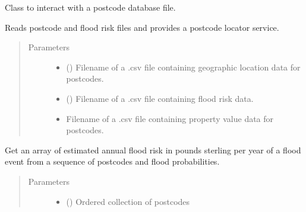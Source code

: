 \documentclass[letterpaper,10pt,english]{sphinxmanual}
\begin{document}
\begin{fulllineitems}
\label{\detokenize{index:flood_tool.Tool}}
Class to interact with a postcode database file.

Reads postcode and flood risk files and provides a postcode locator service.
\begin{quote}\begin{description}
\item[{Parameters}] \leavevmode\begin{itemize}
\item {} 
 (\sphinxstyleliteralemphasis{\sphinxupquote{, }}) \textendash{} Filename of a .csv file containing geographic location data for postcodes.

\item {} 
 (\sphinxstyleliteralemphasis{\sphinxupquote{, }}) \textendash{} Filename of a .csv file containing flood risk data.

\item {} 
 \textendash{} Filename of a .csv file containing property value data for postcodes.

\end{itemize}

\end{description}\end{quote}

\begin{fulllineitems}
\label{\detokenize{index:flood_tool.Tool.get_annual_flood_risk}}
Get an array of estimated annual flood risk in pounds sterling per year of a flood
event from a sequence of postcodes and flood probabilities.
\begin{quote}\begin{description}
\item[{Parameters}] \leavevmode\begin{itemize}
\item {} 
 () \textendash{} Ordered collection of postcodes


\end{itemize}
\end{description}
\end{quote}
\end{fulllineitems}
\end{fulllineitems}
\end{document}

